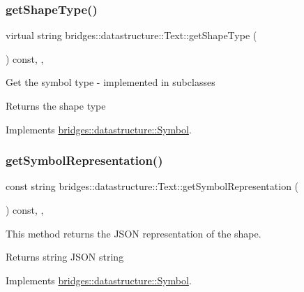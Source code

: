 \subsubsection{\texorpdfstring{get\+Shape\+Type()}{getShapeType()}}
{\footnotesize\ttfamily virtual string bridges\+::datastructure\+::\+Text\+::get\+Shape\+Type (\begin{DoxyParamCaption}{ }\end{DoxyParamCaption}) const\hspace{0.3cm}{\ttfamily [inline]}, {\ttfamily [override]}, {\ttfamily [virtual]}}

Get the symbol type -\/ implemented in subclasses

\begin{DoxyReturn}{Returns}
the shape type 
\end{DoxyReturn}


Implements \hyperlink{classbridges_1_1datastructure_1_1_symbol_a1fb7cabce2915b103b8474658e8549f8}{bridges\+::datastructure\+::\+Symbol}.

\mbox{\label{classbridges_1_1datastructure_1_1_text_ab326f0cf60addd3027a02fd1f90b6961}} 
\subsubsection{\texorpdfstring{get\+Symbol\+Representation()}{getSymbolRepresentation()}}
{\footnotesize\ttfamily const string bridges\+::datastructure\+::\+Text\+::get\+Symbol\+Representation (\begin{DoxyParamCaption}{ }\end{DoxyParamCaption}) const\hspace{0.3cm}{\ttfamily [inline]}, {\ttfamily [override]}, {\ttfamily [virtual]}}



This method returns the J\+S\+ON representation of the shape. 

\begin{DoxyReturn}{Returns}
string J\+S\+ON string 
\end{DoxyReturn}


Implements \hyperlink{classbridges_1_1datastructure_1_1_symbol_a8044b3da559dcd9de8510ae339f126c8}{bridges\+::datastructure\+::\+Symbol}.


